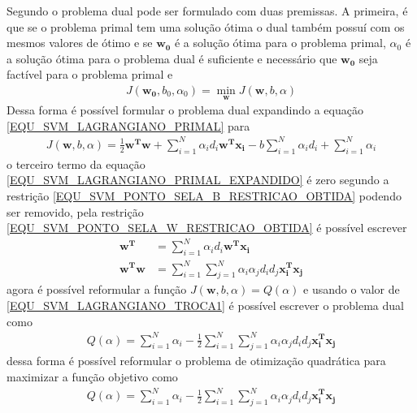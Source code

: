 Segundo  o problema dual pode ser formulado com duas premissas. A primeira, é que se o problema primal tem uma solução ótima o dual também possuí com os mesmos valores de ótimo e se \(\mathbf{w_{0}}\) é a solução ótima para o problema primal, \(\alpha_{0}\) é a solução ótima para o problema dual é suficiente e necessário que \(\mathbf{w_{0}}\) seja factível para o problema primal e
\begin{align}
J(\mathbf{w_{0}}, b_{0}, \alpha_{0}) = \min_{\mathbf{w}} J(\mathbf{w}, b, \alpha)
\end{align}
Dessa forma é possível formular o problema dual expandindo a equação \eqref{EQU_SVM_LAGRANGIANO_PRIMAL} para
\begin{align}
J(\mathbf{w}, b, \alpha) = \frac{1}{2}\mathbf{w^{T}}\mathbf{w} + \sum\limits_{i=1}^{N} \alpha_{i}d_{i}\mathbf{w^{T}}\mathbf{x_{i}} - b\sum\limits_{i=1}^{N} \alpha_{i}d_{i} + \sum\limits_{i=1}^{N} \alpha_{i} \label{EQU_SVM_LAGRANGIANO_PRIMAL_EXPANDIDO}
\end{align}
o terceiro termo da equação \eqref{EQU_SVM_LAGRANGIANO_PRIMAL_EXPANDIDO} é zero segundo a restrição \eqref{EQU_SVM_PONTO_SELA_B_RESTRICAO_OBTIDA} podendo ser removido, pela restrição \eqref{EQU_SVM_PONTO_SELA_W_RESTRICAO_OBTIDA} é possível escrever
\begin{align}
\mathbf{w^{T}} &= \sum\limits_{i=1}^{N} \alpha_{i}d_{i}\mathbf{w^{T}}\mathbf{x_{i}} \\
\mathbf{w^{T}}\mathbf{w} &= \sum\limits_{i=1}^{N} \sum\limits_{j=1}^{N} \alpha_{i}\alpha_{j}d_{i}d_{j}\mathbf{x_{i}^{T}}\mathbf{x_{j}} \label{EQU_SVM_LAGRANGIANO_TROCA1}
\end{align}
agora é possível reformular a função \(J(\mathbf{w}, b, \alpha) = Q(\alpha)\) e usando o valor de \eqref{EQU_SVM_LAGRANGIANO_TROCA1} é possível escrever o problema dual como
\begin{align}
Q(\alpha) = \sum\limits_{i=1}^{N} \alpha_{i} - \frac{1}{2} \sum\limits_{i=1}^{N} \sum\limits_{j=1}^{N} \alpha_{i}\alpha_{j}d_{i}d_{j}\mathbf{x_{i}^{T}}\mathbf{x_{j}} \label{EQU_SVM_LAGRANGIANO_DUAL}
\end{align}
dessa forma é possível reformular o problema de otimização quadrática para maximizar a função objetivo como
\begin{align}
Q(\alpha) = \sum\limits_{i=1}^{N} \alpha_{i} - \frac{1}{2} \sum\limits_{i=1}^{N} \sum\limits_{j=1}^{N} \alpha_{i}\alpha_{j}d_{i}d_{j}\mathbf{x_{i}^{T}}\mathbf{x_{j}} \label{EQU_SVM_OBJETIVO_DUAL}
\end{align}
